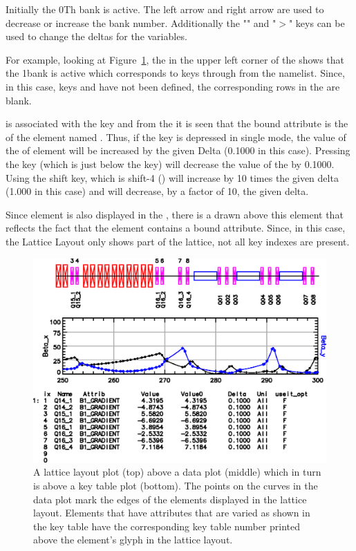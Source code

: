 Initially the 0Th bank is active. The left arrow and right arrow are
used to decrease or increase the bank number.  Additionally the
"\vn{<}" and "$>$" keys can be used to change the deltas for the
variables.

For example, looking at Figure~\ref{f:key.table}, the  in
the upper left corner of the  shows that the 1\St bank
is active which corresponds to keys  through 
from the  namelist.  Since, in this case, keys
 and  have not been defined, the corresponding
rows in the  are blank.

 is associated with the  key and from the  it is seen that the bound attribute is the  of
the element named .  Thus, if the  key is depressed
in single mode, the value of the  of element
 will be increased by the given Delta (0.1000 in this
case). Pressing the  key (which is just below the 
key) will decrease the value of the  by 0.1000. Using
the shift key, which is shift-4 () will increase
 by 10 times the given delta (1.000 in this case) and
 will decrease, by a factor of 10, the given delta.

Since element  is also displayed in the ,
there is a  drawn above this element that reflects the fact
that the element contains a bound attribute. Since, in this case, the
Lattice Layout only shows part of the lattice, not all key indexes are
present.


\begin{figure}
  \centering
  \includegraphics[width=5in]{layout-graph-table.eps}
  \caption[Example key table with a lattice layout and data plots.]
{A lattice layout plot (top) above a data plot (middle) 
which in turn is above a key table plot (bottom). The points on the
curves in the data plot mark the edges of the elements displayed in
the lattice layout. Elements that have attributes that are varied as
shown in the key table have the corresponding key table number printed
above the element's glyph in the lattice layout.}
  \label{f:key.table}
\end{figure}

